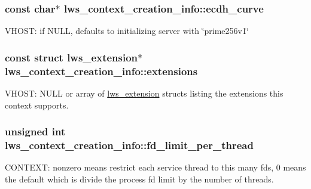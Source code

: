 \subsubsection[{\texorpdfstring{ecdh\+\_\+curve}{ecdh\_curve}}]{\setlength{\rightskip}{0pt plus 5cm}const char$\ast$ lws\+\_\+context\+\_\+creation\+\_\+info\+::ecdh\+\_\+curve}\hypertarget{structlws__context__creation__info_afa5d4e7d9f86b58a1c6fac14f0a5f5f9}{}\label{structlws__context__creation__info_afa5d4e7d9f86b58a1c6fac14f0a5f5f9}
V\+H\+O\+ST\+: if N\+U\+LL, defaults to initializing server with \char`\"{}prime256v1\char`\"{} 
\subsubsection[{\texorpdfstring{extensions}{extensions}}]{\setlength{\rightskip}{0pt plus 5cm}const struct {\bf lws\+\_\+extension}$\ast$ lws\+\_\+context\+\_\+creation\+\_\+info\+::extensions}\hypertarget{structlws__context__creation__info_a4a3d1155fc52f5048b481884f6fb947c}{}\label{structlws__context__creation__info_a4a3d1155fc52f5048b481884f6fb947c}
V\+H\+O\+ST\+: N\+U\+LL or array of \hyperlink{structlws__extension}{lws\+\_\+extension} structs listing the extensions this context supports. 
\subsubsection[{\texorpdfstring{fd\+\_\+limit\+\_\+per\+\_\+thread}{fd\_limit\_per\_thread}}]{\setlength{\rightskip}{0pt plus 5cm}unsigned int lws\+\_\+context\+\_\+creation\+\_\+info\+::fd\+\_\+limit\+\_\+per\+\_\+thread}\hypertarget{structlws__context__creation__info_a45e63e24c88289e0c8352377ef4d3646}{}\label{structlws__context__creation__info_a45e63e24c88289e0c8352377ef4d3646}
C\+O\+N\+T\+E\+XT\+: nonzero means restrict each service thread to this many fds, 0 means the default which is divide the process fd limit by the number of threads. 
